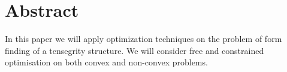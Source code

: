\section{Abstract}
In this paper we will apply optimization techniques on the problem of form finding of a tensegrity structure. We will consider free and constrained optimisation on both convex and non-convex problems.